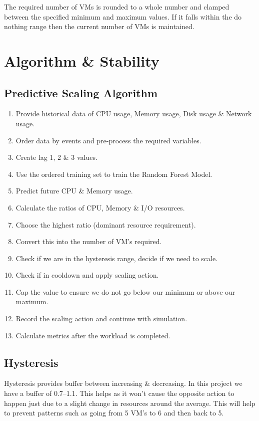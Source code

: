\documentclass[10pt,journal,compsoc]{IEEEtran}
\begin{document}
The required number of VMs is rounded to a whole number and clamped between the specified minimum and maximum values. If it falls within the do nothing range then the current number of VMs is maintained.

\section{Algorithm \& Stability}

\subsection{Predictive Scaling Algorithm}
\begin{enumerate}
    \item Provide historical data of CPU usage, Memory usage, Disk usage \& Network usage.
    \item Order data by events and pre-process the required variables.
    \item Create lag 1, 2 \& 3 values.
    \item Use the ordered training set to train the Random Forest Model.
    \item Predict future CPU \& Memory usage.
    \item Calculate the ratios of CPU, Memory \& I/O resources.
    \item Choose the highest ratio (dominant resource requirement).
    \item Convert this into the number of VM's required.
    \item Check if we are in the hysteresis range, decide if we need to scale.
    \item Check if in cooldown and apply scaling action.
    \item Cap the value to ensure we do not go below our minimum or above our maximum.
    \item Record the scaling action and continue with simulation.
    \item Calculate metrics after the workload is completed.
\end{enumerate}

\subsection{Hysteresis}
Hysteresis provides buffer between increasing \& decreasing. In this project we have a buffer of 0.7--1.1. This helps as it won't cause the opposite action to happen just due to a slight change in resources around the average. This will help to prevent patterns such as going from 5 VM's to 6 and then back to 5.
\end{document}
